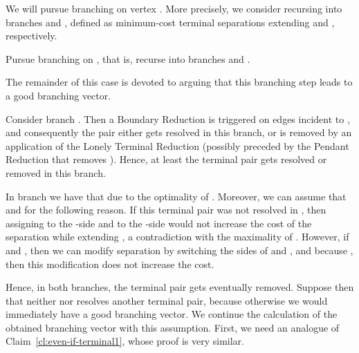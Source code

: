 We will pursue branching on vertex .  More precisely, we consider recursing into branches  and , defined as minimum-cost terminal separations extending  and , respectively.

\begin{branching}
Pursue branching on , that is, recurse into branches  and .
\end{branching}

The remainder of this case is devoted to arguing that this branching step leads to a good branching vector.

Consider branch . Then a Boundary Reduction is triggered on edges incident to , and consequently the pair  either gets resolved in this branch, or is removed by an application of the Lonely Terminal Reduction (possibly preceded by the Pendant Reduction that removes ). Hence, at least the terminal pair  gets resolved or removed in this branch. 

In branch  we have that  due to the optimality of . Moreover, we can assume that  and  for the following reason. If this terminal pair was not resolved in , then assigning  to the -side and  to the -side would not increase the cost of the separation while extending , a contradiction with the maximality of . However, if  and , then we can modify separation  by switching the sides of  and , and because , then this modification does not increase the cost. 

Hence, in both branches, the terminal pair  gets eventually removed. Suppose then that neither  nor  resolves another terminal pair, because otherwise we would immediately have a good branching vector. We continue the calculation of the obtained branching vector with this assumption. First, we need an analogue of Claim~\ref{cl:even-if-terminal1}, whose proof is very similar.

